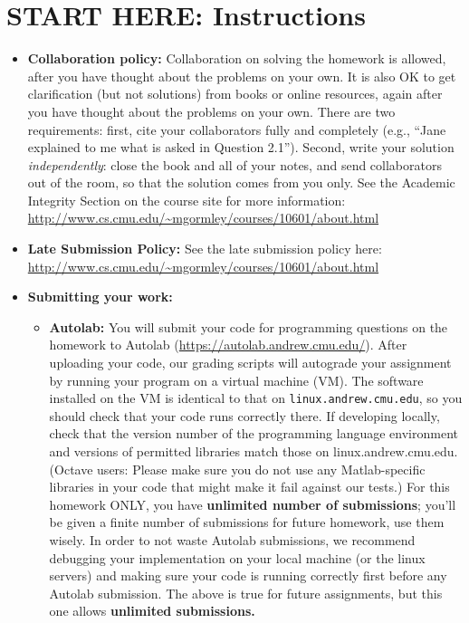 \documentclass[12pt]{article}
\begin{document}
\section*{START HERE: Instructions}
\begin{itemize}
\item \textbf{Collaboration policy:} Collaboration on solving the homework is allowed, after you have thought about the problems on your own. It is also OK to get clarification (but not solutions) from books or online resources, again after you have thought about the problems on your own. There are two requirements: first, cite your collaborators fully and completely (e.g., ``Jane explained to me what is asked in Question 2.1''). Second, write your solution {\em independently}: close the book and all of your notes, and send collaborators out of the room, so that the solution comes from you only.  See the Academic Integrity Section on the course site for more information: \url{http://www.cs.cmu.edu/~mgormley/courses/10601/about.html}

\item\textbf{Late Submission Policy:} See the late submission policy here: \url{http://www.cs.cmu.edu/~mgormley/courses/10601/about.html}

\item\textbf{Submitting your work:} 

\begin{itemize}

\item \textbf{Autolab:} You will submit your code for programming questions on the homework to Autolab (\url{https://autolab.andrew.cmu.edu/}). After uploading your code, our grading scripts will autograde your assignment by running your program on a virtual machine (VM). The software installed on the VM is identical to that on \texttt{linux.andrew.cmu.edu}, so you should check that your code runs correctly there. If developing locally, check that the version number of the programming language environment and versions of permitted libraries match those on linux.andrew.cmu.edu. (Octave users: Please make sure you do not use any Matlab-specific libraries in your code that might make it fail against our tests.) For this homework ONLY, you have \textbf{unlimited number of submissions}; you'll be given a finite number of submissions for future homework, use them wisely. In order to not waste Autolab submissions, we recommend debugging your implementation on your local machine (or the linux servers) and making sure your code is running correctly first before any Autolab submission. {\color{red} The above is true for future assignments, but this one allows \textbf{unlimited submissions.}}


\end{itemize}
\end{itemize}
\end{document}

